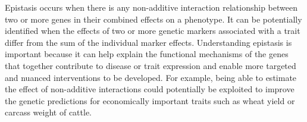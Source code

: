 \documentclass[authoryear,preprint,review,12pt]{elsarticle}
\begin{document}
Epistasis occurs when there is any non-additive interaction relationship between two or more genes in their combined
effects on a phenotype. It can be potentially identified when the effects of two or more genetic markers associated with
a trait differ from the sum of the individual marker effects. Understanding epistasis is important because it can help
explain the functional mechanisms of the genes that together contribute to disease or trait expression and enable more
targeted and nuanced interventions to be developed. For example, being able to estimate the effect of non-additive
interactions could potentially be exploited to improve the genetic predictions \cite[]{Ansarifar.et.al.2020} for
economically important traits such as wheat yield or carcass weight of cattle.



\end{document}
